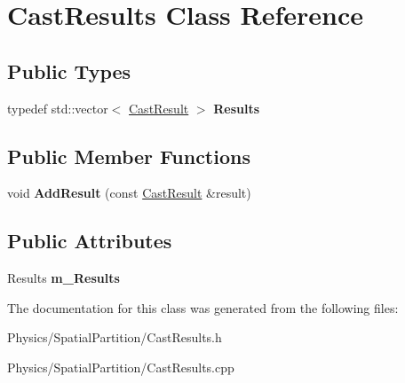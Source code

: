 \hypertarget{classCastResults}{}\section{Cast\+Results Class Reference}
\label{classCastResults}
\subsection*{Public Types}
\begin{DoxyCompactItemize}
\item 
\mbox{\label{classCastResults_a96c98918bc6f75030603ae54a470632a}} 
typedef std\+::vector$<$ \hyperlink{classCastResult}{Cast\+Result} $>$ {\bfseries Results}
\end{DoxyCompactItemize}
\subsection*{Public Member Functions}
\begin{DoxyCompactItemize}
\item 
\mbox{\label{classCastResults_a62ee1ac3a8107eb7f8be4d991e9c47c5}} 
void {\bfseries Add\+Result} (const \hyperlink{classCastResult}{Cast\+Result} \&result)
\end{DoxyCompactItemize}
\subsection*{Public Attributes}
\begin{DoxyCompactItemize}
\item 
\mbox{\label{classCastResults_acb2777d80f4f46a8fc1954ea9fd7b431}} 
Results {\bfseries m\+\_\+\+Results}
\end{DoxyCompactItemize}


The documentation for this class was generated from the following files\+:\begin{DoxyCompactItemize}
\item 
Physics/\+Spatial\+Partition/Cast\+Results.\+h\item 
Physics/\+Spatial\+Partition/Cast\+Results.\+cpp\end{DoxyCompactItemize}
